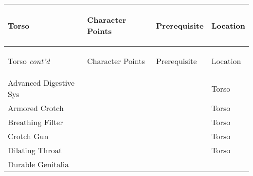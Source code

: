 \documentclass[twoside]{book}
\begin{document}
\begin{longtable}{p{1.25in}p{2em}ll} 
  Torso
  &
  \begin{turn}{70}{Character Points}\end{turn}
          
  &
  \begin{turn}{70}{Prerequisite}\end{turn}
          
  &
  \begin{turn}{70}{Location}\end{turn}
          
  \\
  \hline
  \hline
  \endfirsthead
  Torso \textit{cont'd}
        
  &
  \begin{turn}{70}{Character Points}\end{turn}
          
  &
  \begin{turn}{70}{Prerequisite}\end{turn}
          
  &
  \begin{turn}{70}{Location}\end{turn}
          
  \\
  \hline
  \endhead
      
  \raggedright
           Advanced Digestive Sys 
  &
  
  &
  
  &
   Torso 
  \tabularnewline
      
  \raggedright
           Armored Crotch 
  &
  
  &
  
  &
   Torso 
  \tabularnewline
      
  \raggedright
           Breathing Filter 
  &
  
  &
  
  &
   Torso 
  \tabularnewline
      
  \raggedright
           Crotch Gun 
  &
  
  &
  
  &
   Torso 
  \tabularnewline
      
  \raggedright
           Dilating Throat 
  &
  
  &
  
  &
   Torso 
  \tabularnewline
      
  \raggedright
           Durable Genitalia 
  &
  
  &
  

\end{longtable}
\end{document}

